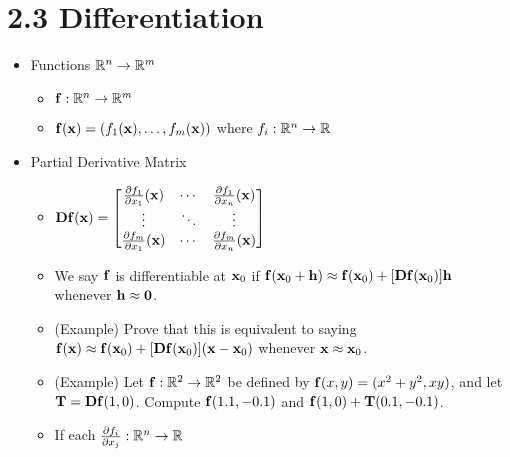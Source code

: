 \documentclass[11pt]{article}
\begin{document}

\section*{2.3 Differentiation}

\begin{itemize}
  \item Functions \(\mathbb R^n\to\mathbb R^m\)
    \begin{itemize}
      \item \(\mathbf{f}:\mathbb R^n\to\mathbb R^m\)
      \item
        \(
          \mathbf{f}(\mathbf{x})
            =
          (f_1(\mathbf{x}),\dots,f_m(\mathbf{x}))
        \) where \(f_i:\mathbb R^n\to \mathbb R\)
    \end{itemize}
  \item Partial Derivative Matrix
    \begin{itemize}
      \item
        \(\displaystyle
          \mathbf{D}\mathbf{f}(\mathbf{x})
            =
          \begin{bmatrix}
            \frac{\partial f_1}{\partial x_1}(\mathbf{x}) &
            \cdots &
            \frac{\partial f_1}{\partial x_n}(\mathbf{x})
            \\
            \vdots & \ddots & \vdots
            \\
            \frac{\partial f_m}{\partial x_1}(\mathbf{x}) &
            \cdots &
            \frac{\partial f_m}{\partial x_n}(\mathbf{x})
          \end{bmatrix}
        \)
      \item
        We say \(\mathbf{f}\) is differentiable at \(\mathbf{x}_0\) if
        \(
          \mathbf{f}(\mathbf{x}_0+\mathbf{h})
            \approx
          \mathbf{f}(\mathbf{x}_0)+[\mathbf{D}\mathbf{f}(\mathbf{x}_0)]\mathbf{h}
        \)
        whenever \(\mathbf{h} \approx \mathbf{0}\).
      \item (Example) Prove that this is equivalent to saying
        \(
          \mathbf{f}(\mathbf{x})
            \approx
          \mathbf{f}(\mathbf{x}_0)+[\mathbf{D}\mathbf{f}(\mathbf{x}_0)](\mathbf{x}-\mathbf{x}_0)
        \)
        whenever \(\mathbf{x}\approx\mathbf{x}_0\).
      \item (Example) Let \(\mathbf{f}:\mathbb R^2\to\mathbb R^2\) be defined by
        \(\mathbf{f}(x,y)=(x^2+y^2,xy)\), and let
        \(\mathbf{T}=\mathbf{D}\mathbf{f}(1,0)\). Compute
        \(\mathbf{f}(1.1,-0.1)\) and \(\mathbf{f}(1,0)+\mathbf{T}(0.1,-0.1)\).
      \item If each \(\frac{\partial f_i}{\partial x_j}:\mathbb R^n\to\mathbb R\)

\end{itemize}
\end{itemize}
\end{document}
